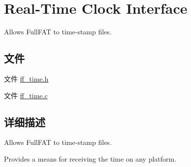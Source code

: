 \hypertarget{group___t_i_m_e}{}\section{Real-\/\+Time Clock Interface}
\label{group___t_i_m_e}


Allows Full\+F\+AT to time-\/stamp files.  


\subsection*{文件}
\begin{DoxyCompactItemize}
\item 
文件 \hyperlink{ff__time_8h}{ff\+\_\+time.\+h}
\item 
文件 \hyperlink{ff__time_8c}{ff\+\_\+time.\+c}
\end{DoxyCompactItemize}


\subsection{详细描述}
Allows Full\+F\+AT to time-\/stamp files. 

Provides a means for receiving the time on any platform. 
